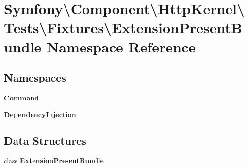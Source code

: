 \section{Symfony\textbackslash{}Component\textbackslash{}Http\+Kernel\textbackslash{}Tests\textbackslash{}Fixtures\textbackslash{}Extension\+Present\+Bundle Namespace Reference}
\label{namespace_symfony_1_1_component_1_1_http_kernel_1_1_tests_1_1_fixtures_1_1_extension_present_bundle}
\subsection*{Namespaces}
\begin{DoxyCompactItemize}
\item 
 {\bf Command}
\item 
 {\bf Dependency\+Injection}
\end{DoxyCompactItemize}
\subsection*{Data Structures}
\begin{DoxyCompactItemize}
\item 
class {\bf Extension\+Present\+Bundle}
\end{DoxyCompactItemize}
